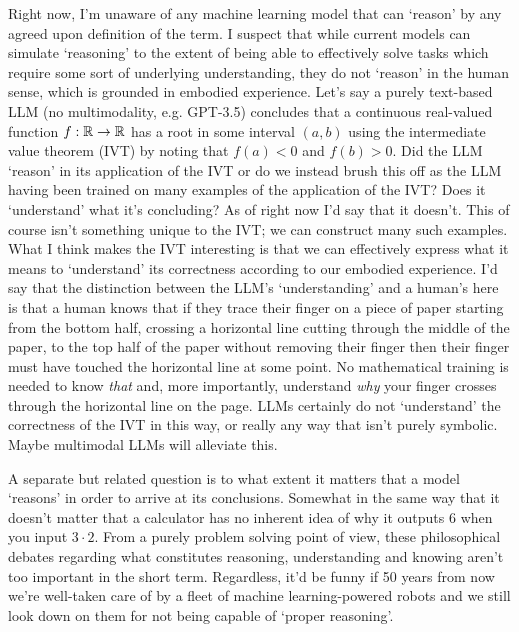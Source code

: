 \documentclass[11pt]{article}
\begin{document}
\begin{appendices}
Right now, I'm unaware of any machine learning model that can `reason' by any agreed upon definition of the term. I suspect that while current models can simulate `reasoning' to the extent of being able to effectively solve tasks which require some sort of underlying understanding, they do not `reason' in the human sense, which is grounded in embodied experience. Let's say a purely text-based LLM (no multimodality, e.g. GPT-3.5) concludes that a continuous real-valued function $f:\mathbb{R}\rightarrow\mathbb{R}$ has a root in some interval $(a, b)$ using the intermediate value theorem (IVT) by noting that $f(a)<0$ and $f(b)>0$. Did the LLM `reason' in its application of the IVT or do we instead brush this off as the LLM having been trained on many examples of the application of the IVT? Does it `understand' what it's concluding? As of right now I'd say that it doesn't. This of course isn't something unique to the IVT; we can construct many such examples. What I think makes the IVT interesting is that we can effectively express what it means to `understand' its correctness according to our embodied experience. I'd say that the distinction between the LLM's `understanding' and a human's here is that a human knows that if they trace their finger on a piece of paper starting from the bottom half, crossing a horizontal line cutting through the middle of the paper, to the top half of the paper without removing their finger then their finger must have touched the horizontal line at some point. No mathematical training is needed to know \textit{that} and, more importantly, understand \textit{why} your finger crosses through the horizontal line on the page. LLMs certainly do not `understand' the correctness of the IVT in this way, or really any way that isn't purely symbolic. Maybe multimodal LLMs will alleviate this.

A separate but related question is to what extent it matters that a model `reasons' in order to arrive at its conclusions. Somewhat in the same way that it doesn't matter that a calculator has no inherent idea of why it outputs $6$ when you input $3\cdot2$. From a purely problem solving point of view, these philosophical debates regarding what constitutes reasoning, understanding and knowing aren't too important in the short term. Regardless, it'd be funny if 50 years from now we're well-taken care of by a fleet of machine learning-powered robots and we still look down on them for not being capable of `proper reasoning'.


\end{appendices}
\end{document}
